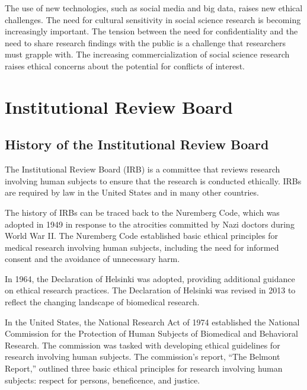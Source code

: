 \documentclass[
  b5paper]{book}
\begin{document}
The use of new technologies, such as social media and big data, raises new ethical challenges. The need for cultural sensitivity in social science research is becoming increasingly important. The tension between the need for confidentiality and the need to share research findings with the public is a challenge that researchers must grapple with. The increasing commercialization of social science research raises ethical concerns about the potential for conflicts of interest.

\hypertarget{institutional-review-board}{%
\section{Institutional Review Board}\label{institutional-review-board}}

\hypertarget{history-of-the-institutional-review-board}{%
\subsection*{History of the Institutional Review Board}\label{history-of-the-institutional-review-board}}

The Institutional Review Board (IRB) is a committee that reviews research involving human subjects to ensure that the research is conducted ethically. IRBs are required by law in the United States and in many other countries.

The history of IRBs can be traced back to the Nuremberg Code, which was adopted in 1949 in response to the atrocities committed by Nazi doctors during World War II. The Nuremberg Code established basic ethical principles for medical research involving human subjects, including the need for informed consent and the avoidance of unnecessary harm.

In 1964, the Declaration of Helsinki was adopted, providing additional guidance on ethical research practices. The Declaration of Helsinki was revised in 2013 to reflect the changing landscape of biomedical research.

In the United States, the National Research Act of 1974 established the National Commission for the Protection of Human Subjects of Biomedical and Behavioral Research. The commission was tasked with developing ethical guidelines for research involving human subjects. The commission's report, ``The Belmont Report,'' outlined three basic ethical principles for research involving human subjects: respect for persons, beneficence, and justice.
\end{document}
